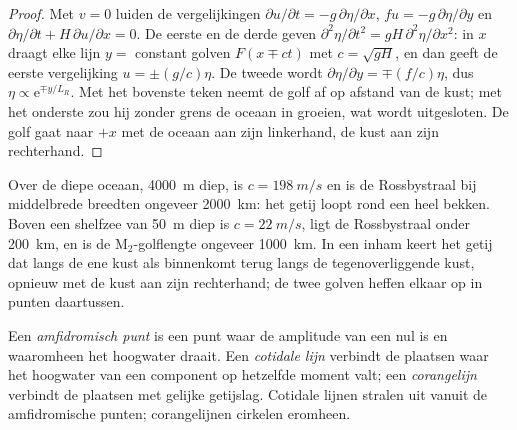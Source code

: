 \begin{proof}
Met $v = 0$ luiden de vergelijkingen $\partial u/\partial t = -g\,\partial\eta/
\partial x$, $fu = -g\,\partial\eta/\partial y$ en $\partial\eta/\partial t
+ H\,\partial u/\partial x = 0$. De eerste en de derde geven $\partial^2
\eta/\partial t^2 = gH\,\partial^2\eta/\partial x^2$: in $x$ draagt elke lijn
$y = $ constant golven $F(x \mp ct)$ met $c = \sqrt{gH}$, en dan geeft de
eerste vergelijking $u = \pm(g/c)\eta$. De tweede wordt $\partial\eta/
\partial y = \mp(f/c)\eta$, dus $\eta \propto \mathrm e^{\mp y/L_R}$. Met
het bovenste teken neemt de golf af op afstand van de kust; met het onderste
zou hij zonder grens de oceaan in groeien, wat wordt uitgesloten. De golf
gaat naar $+x$ met de oceaan aan zijn linkerhand, de kust aan zijn rechterhand.
\end{proof}

Over de diepe oceaan, \qty{4000}{m} diep, is $c = \qty{198}{m/s}$ en is de
Rossbystraal bij middelbrede breedten ongeveer \qty{2000}{km}: het getij loopt
rond een heel bekken. Boven een shelfzee van \qty{50}{m} diep is $c =
\qty{22}{m/s}$, ligt de Rossbystraal onder \qty{200}{km}, en is de
M$_2$-golflengte ongeveer \qty{1000}{km}. In een inham keert het getij dat langs
de ene kust als  binnenkomt terug langs de tegenoverliggende kust,
opnieuw met de kust aan zijn rechterhand; de twee golven heffen elkaar op in punten daartussen.

\begin{definition}\label{def:b3:ocean-dynamics:amphidrome}
Een \emph{amfidromisch punt} is een punt waar de
amplitude van een  nul is en waaromheen het hoogwater
draait. Een \emph{cotidale lijn} verbindt de plaatsen waar
het hoogwater van een component op hetzelfde moment valt; een \emph{corangelijn}
verbindt de plaatsen met gelijke getijslag. Cotidale
lijnen stralen uit vanuit de amfidromische punten; corangelijnen cirkelen eromheen.
\end{definition}

